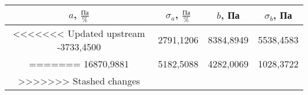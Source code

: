 \begin{tabular}[t]{|c|c|c|c|}
\hline
$a$, $\frac{Па}{\%}$ & $\sigma_a$, $\frac{Па}{\%}$ & $b$, Па & $\sigma_b$, Па \\ 
\hline
<<<<<<< Updated upstream
-3733,4500 & 2791,1206 & 8384,8949 & 5538,4583 \\ 
=======
16870,9881 & 5182,5088 & 4282,0069 & 1028,3722 \\ 
>>>>>>> Stashed changes
\hline
\end{tabular}
